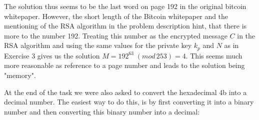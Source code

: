 \documentclass[12pt]{article}
\begin{document}
\begin{figure}[h!]
	\centering
\end{figure}
The solution thus seems to be the last word on page 192 in the original bitcoin whitepaper. However, the short length of the Bitcoin whitepaper and the mentioning of the RSA algorithm in the problem description hint, that there is more to the number 192. Treating this number as the encrypted message $C$ in the RSA algorithm and using the same values for the private key $k_p$ and $N$ as in Exercise 3 gives us the solution $M = 192^{63}\;(mod\, 253) = 4$. This seems much more reasonable as reference to a page number and leads to the solution being "memory".\par 
At the end of the task we were also asked to convert the hexadecimal 4b into a decimal number. The easiest way to do this, is by first converting it into a binary number and then converting this binary number into a decimal:
\end{document}
